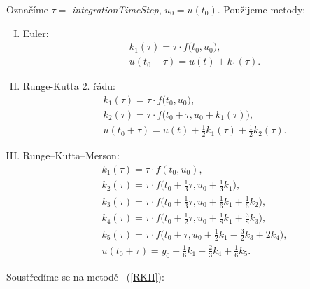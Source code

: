 \documentclass[11pt,american,czech]{article}
\begin{document}
\noindent
Označíme $\tau=$ \textit{integrationTimeStep}, $u_{0}=u(t_{0})$. Použijeme  metody:
\begin{enumerate}[I.]
	\item Euler:
		\begin{equation*}
			\begin{split}
	&k_{1}(\tau)=\tau\cdot f\big(t_{0}, u_{0}\big), \\
	&u(t_0+\tau)=u(t) + k_{1}(\tau).
			\end{split}
		\end{equation*}
	\item Runge-Kutta 2. řádu: \label{RKII}
		\begin{equation*}
			\begin{split}
				&k_{1}(\tau)=\tau\cdot f\big(t_{0}, u_{0}\big), \\
				&k_{2}(\tau)=\tau\cdot f\big(t_{0}+\tau, u_{0}+k_{1}(\tau)\big), \\
				&u(t_0+\tau)=u(t) + \tfrac{1}{2}k_{1}(\tau)+\tfrac{1}{2}k_{2}(\tau).
			\end{split}
		\end{equation*}
	\item Runge–Kutta–Merson:
		\begin{equation*}
			\begin{split}
		&k_{1}(\tau) = \tau\cdot f(t_{0},u_{0}),\\
		&k_{2}(\tau) = \tau\cdot f \big( t_{0} + \tfrac13 \tau, u_{0} + \tfrac13 k_1 \big),\\
		&k_{3}(\tau) = \tau\cdot f \big( t_{0} + \tfrac13 \tau, u_{0} + \tfrac16 k_1 + \tfrac16 k_2 \big),\\
		&k_{4}(\tau) = \tau\cdot f \big( t_{0} + \tfrac12 \tau, u_{0} + \tfrac18 k_1 + \tfrac38 k_3 \big),\\
		&k_{5}(\tau) = \tau\cdot f \big( t_{0} + \tau, u_{0} + \tfrac12 k_1 - \tfrac32 k_3 + 2 k_4 \big),\\
		&u(t_{0}+\tau) = y_0 + \tfrac16 k_1 + \tfrac23 k_4 + \tfrac16 k_5.
			\end{split}
		\end{equation*}
\end{enumerate}

\noindent
Soustředíme se na metodě ~(\ref{RKII}):
\end{document}

